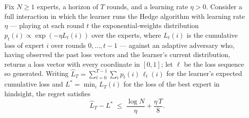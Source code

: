 \begin{theorem}
\label{hedge_regret_bound_tight_of_episode}
\leanok
{}
Fix $N \ge 1$ experts, a horizon of $T$ rounds, and a learning rate $\eta > 0$. Consider
a full interaction in which the learner runs the Hedge algorithm with learning rate
$\eta$ — playing at each round $t$ the exponential-weights distribution $p_t(i) \propto
\exp(-\eta L_t(i))$ over the experts, where $L_t(i)$ is the cumulative loss of expert
$i$ over rounds $0,\dots,t-1$ — against an adaptive adversary who, having observed the
past loss vectors and the learner's current distribution, returns a loss vector with
every coordinate in $[0,1]$; let $\ell$ be the loss sequence so generated. Writing
$\widehat{L}_T = \sum_{t=0}^{T-1}\sum_{i} p_t(i)\,\ell_t(i)$ for the learner's expected
cumulative loss and $L^\ast = \min_{i} L_T(i)$ for the loss of the best expert in
hindsight, the regret satisfies
\[
  \widehat{L}_T - L^\ast \;\le\; \frac{\log N}{\eta} + \frac{\eta\, T}{8}.
\]
\end{theorem}
